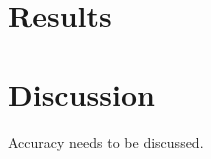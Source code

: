 \documentclass[11pt]{article}
\begin{document}

\section{Results}






\section{Discussion}

Accuracy needs to be discussed.
\end{document}
